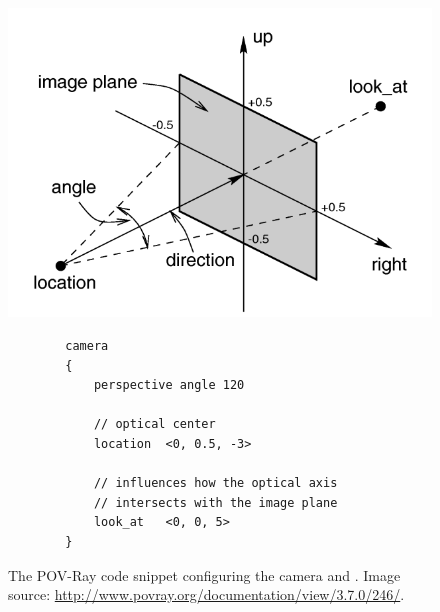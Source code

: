 \documentclass[a4paper,twocolumn]{article}
\begin{document}
	\begin{figure}
		\centering
		\includegraphics[width=0.9\columnwidth]{images/povray_camera.png}
		\begin{verbatim}
		camera
		{
		    perspective angle 120
		    
		    // optical center
		    location  <0, 0.5, -3>
		    
		    // influences how the optical axis
		    // intersects with the image plane
		    look_at   <0, 0, 5>
		}
		\end{verbatim}
		\caption{The POV-Ray code snippet configuring the camera and . Image source: \url{http://www.povray.org/documentation/view/3.7.0/246/}.}
		\label{fig:povray_camera}
	\end{figure}
	
\end{document}
